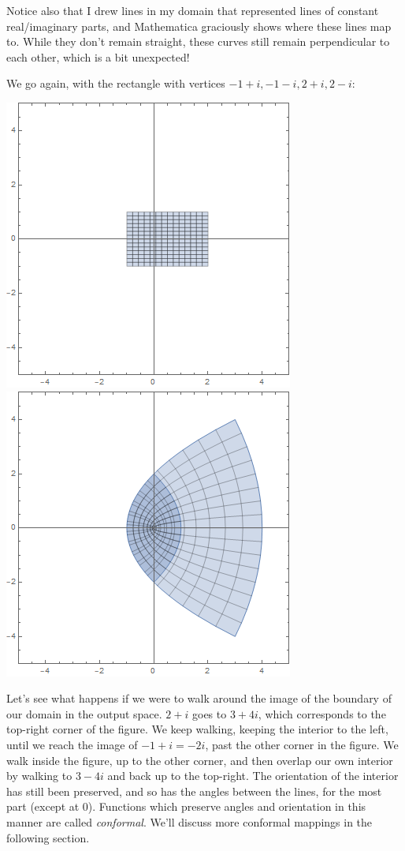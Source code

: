 \documentclass[12pt]{scrartcl}
\begin{document}
Notice also that I drew lines in my domain that represented lines of constant real/imaginary parts, and Mathematica graciously shows where these lines map to. While they don't remain straight, these curves still remain perpendicular to each other, which is a bit unexpected!

We go again, with the rectangle with vertices $-1+i, -1-i, 2+i, 2-i$:
\begin{center}
	\includegraphics[scale=0.5]{images/domzsqr1.png}
	\includegraphics[scale=0.5]{images/ranzsqr1.png}
\end{center}
Let's see what happens if we were to walk around the image of the boundary of our domain in the output space. $2+i$ goes to $3+4i$, which corresponds to the top-right corner of the figure. We keep walking, keeping the interior to the left, until we reach the image of $-1+i = -2i$, past the other corner in the figure. We walk inside the figure, up to the other corner, and then overlap our own interior by walking to $3-4i$ and back up to the top-right. The orientation of the interior has still been preserved, and so has the angles between the lines, for the most part (except at 0). Functions which preserve angles and orientation in this manner are called \textit{conformal}. We'll discuss more conformal mappings in the following section.
\end{document}
